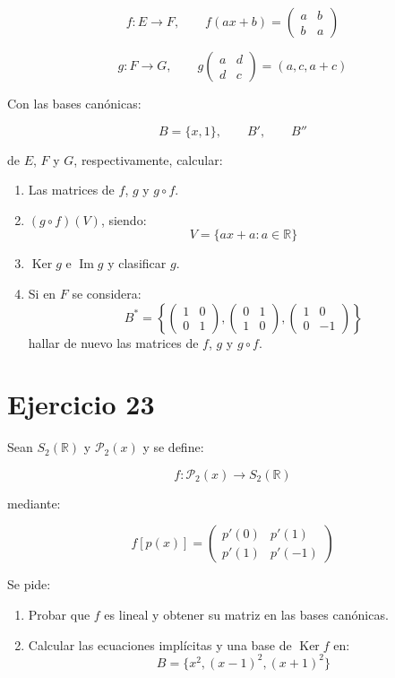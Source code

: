 \documentclass[11pt,a4paper]{article}
\newcommand{\R}{\mathbb{R}}
\newcommand{\Ker}{\operatorname{Ker}}
\newcommand{\Ima}{\operatorname{Im}}
\begin{document}
\[
f:E\to F,
\qquad
f(ax+b)
=
\begin{pmatrix}
a&b\\
b&a
\end{pmatrix}
\]

\[
g:F\to G,
\qquad
g
\begin{pmatrix}
a&d\\
d&c
\end{pmatrix}
=
(a,c,a+c)
\]

Con las bases canónicas:

\[
B=\{x,1\},
\qquad
B',
\qquad
B''
\]

de $E$, $F$ y $G$, respectivamente, calcular:

\begin{enumerate}[label=\alph*)]
	\item Las matrices de $f$, $g$ y $g\circ f$.
	\item $(g\circ f)(V)$, siendo:
	\[
	V=\{ax+a:a\in\R\}
	\]
	\item $\Ker g$ e $\Ima g$ y clasificar $g$.
	\item Si en $F$ se considera:
	\[
	B^*=
	\left\{
	\begin{pmatrix}1&0\\0&1\end{pmatrix},
	\begin{pmatrix}0&1\\1&0\end{pmatrix},
	\begin{pmatrix}1&0\\0&-1\end{pmatrix}
	\right\}
	\]
	hallar de nuevo las matrices de $f$, $g$ y $g\circ f$.
\end{enumerate}

\section{Ejercicio 23}
Sean $S_2(\R)$ y $\mathcal{P}_2(x)$ y se define:

\[
f:\mathcal{P}_2(x)\longrightarrow S_2(\R)
\]

mediante:

\[
f[p(x)]
=
\begin{pmatrix}
p'(0)&p'(1)\\
p'(1)&p'(-1)
\end{pmatrix}
\]

Se pide:

\begin{enumerate}[label=\alph*)]
	\item Probar que $f$ es lineal y obtener su matriz en las bases canónicas.
	\item Calcular las ecuaciones implícitas y una base de $\Ker f$ en:
	\[
	B=\{x^2,(x-1)^2,(x+1)^2\}
	\]
\end{enumerate}
\end{document}
